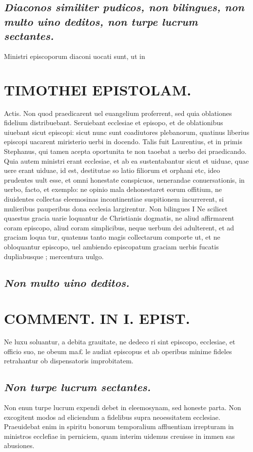 \documentclass{article}
\begin{document}
\begin{pages}
\subsection*{\textit{Diaconos similiter pudicos, non bilingues, non multo uino deditos, non turpe lucrum sectantes. }}\pstart Ministri episcoporum diaconi uocati sunt, ut in  \pend
\section*{TIMOTHEI EPISTOLAM. }
\marginpar{[ p.81 ]}\pstart Actis. Non quod praedicarent uel euangelium proferrent, sed quia oblationes fidelium distribuebant. Seruiebant ecclesiae et episopo, et de oblationibus uiuebant sicut episcopi: sicut nunc sunt coadiutores plebanorum, quatinus liberius episcopi uacarent miristerio uerbi in docendo. Talis fuit Laurentius, et in primis Stephanus, qui tamen acepta oportunita te non taoebat a uerbo dei praedicando. Quia autem ministri erant ecclesiae, et ab ea sustentabantur sicut et uiduae, quae uere erant uiduae, id est, destitutae so latio filiorum et orphani etc, ideo prudentes uult esse, et omni honestate conspicuos, uenerandae conuersationis, in uerbo, facto, et exemplo: ne opinio mala dehonestaret eorum offitium, ne diuidentes collectas eleemosinas incontinentiae suspitionem incurrerent, si mulieribus pauperibus dona ecclesia largirentur.  \pend\pstart Non bilingues I Ne scilicet quaestus gracia uarie loquantur de Christianis dogmatis, ne aliud affirmarent coram episcopo, aliud coram simplicibus, neque uerbum dei adulterent, et ad graciam loqua tur, quatenus tanto magis collectarum comporte ut, et ne obloquantur episcopo, uel ambiendo episcopatum graciam uerbis fucatis dupliabusque ; mercentura uulgo.  \pend
{}
{}
\subsection*{\textit{Non multo uino deditos. }}
\section*{COMMENT. IN I. EPIST. }
\marginpar{[ p.82 ]}\pstart Ne luxu soluantur, a debita grauitate, ne dedeco ri sint episcopo, ecclesiae, et officio suo, ne obeum ma£ le audiat episcopus et ab operibus minime fideles retrahantur ob dispensatoris improbitatem.  \pend
{}
{}
\subsection*{\textit{Non turpe lucrum sectantes. }}\pstart Non enun turpe lucrum expendi debet in eleemosynam, sed honeste parta. Non excogitent modos ad eliciendum a fidelibus supra neoessitatem ecclesiae. Praeuidebat enim in spiritu bonorum temporalium affluentiam irrepturam in ministros ecclefiae in perniciem, quam interim uidemus creuisse in immen sas abusiones.  \pend
{}
{}

\end{pages}
\end{document}
